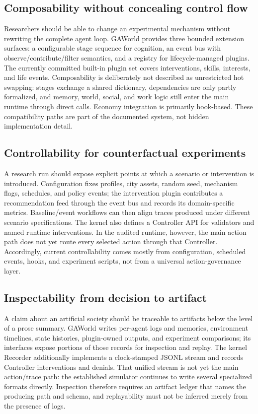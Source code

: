\subsection{Composability without concealing control flow}

Researchers should be able to change an experimental mechanism without
rewriting the complete agent loop.  GAWorld provides three bounded extension
surfaces: a configurable stage sequence for cognition, an event bus with
observe/contribute/filter semantics, and a registry for lifecycle-managed
plugins.  The currently committed built-in plugin set covers interventions,
skills, interests, and life events.  Composability is deliberately not described as
unrestricted hot swapping: stages exchange a shared dictionary, dependencies
are only partly formalized, and memory, world, social, and work logic still
enter the main runtime through direct calls.  Economy integration is primarily
hook-based.  These compatibility paths are part of the documented system, not
hidden implementation detail.

\subsection{Controllability for counterfactual experiments}

A research run should expose explicit points at which a scenario or
intervention is introduced.  Configuration fixes profiles, city assets,
random seed, mechanism flags, schedules, and policy events; the intervention
plugin contributes a recommendation feed through the event bus and records
its domain-specific metrics.  Baseline/event workflows can then align traces
produced under different scenario specifications.  The kernel also defines a
Controller API for validators and named runtime interventions.  In the audited
runtime, however, the main action path does not yet route every selected
action through that Controller.  Accordingly, current controllability comes
mostly from configuration, scheduled events, hooks, and experiment scripts,
not from a universal action-governance layer.

\subsection{Inspectability from decision to artifact}

A claim about an artificial society should be traceable to artifacts below the
level of a prose summary.  GAWorld writes per-agent logs and memories,
environment timelines, state histories, plugin-owned outputs, and experiment
comparisons; its interfaces expose portions of those records for inspection
and replay.  The kernel Recorder additionally implements a clock-stamped JSONL
stream and records Controller interventions and denials.  That unified stream
is not yet the main action/trace path: the established simulator continues to
write several specialized formats directly.  Inspection therefore requires
an artifact ledger that names the producing path and schema, and replayability
must not be inferred merely from the presence of logs.

